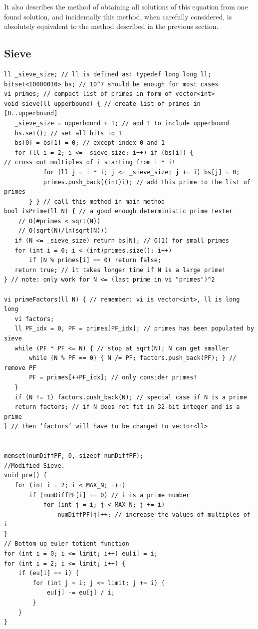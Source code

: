 \documentclass[8pt, a4paper, oneside, twocolumn]{extarticle}
\begin{document}
It also describes the method of obtaining all solutions of this equation from one found solution, and incidentally this method, when carefully considered, is absolutely equivalent to the method described in the previous section.
\subsection{Sieve}
\begin{verbatim}
ll _sieve_size; // ll is defined as: typedef long long ll;
bitset<10000010> bs; // 10^7 should be enough for most cases
vi primes; // compact list of primes in form of vector<int>
void sieve(ll upperbound) { // create list of primes in [0..upperbound]
   _sieve_size = upperbound + 1; // add 1 to include upperbound
   bs.set(); // set all bits to 1
   bs[0] = bs[1] = 0; // except index 0 and 1
   for (ll i = 2; i <= _sieve_size; i++) if (bs[i]) {
// cross out multiples of i starting from i * i!
           for (ll j = i * i; j <= _sieve_size; j += i) bs[j] = 0;
           primes.push_back((int)i); // add this prime to the list of primes
       } } // call this method in main method
bool isPrime(ll N) { // a good enough deterministic prime tester
    // O(#primes < sqrt(N))
    // O(sqrt(N)/ln(sqrt(N)))
   if (N <= _sieve_size) return bs[N]; // O(1) for small primes
   for (int i = 0; i < (int)primes.size(); i++)
       if (N % primes[i] == 0) return false;
   return true; // it takes longer time if N is a large prime!
} // note: only work for N <= (last prime in vi "primes")^2

vi primeFactors(ll N) { // remember: vi is vector<int>, ll is long long
   vi factors;
   ll PF_idx = 0, PF = primes[PF_idx]; // primes has been populated by sieve
   while (PF * PF <= N) { // stop at sqrt(N); N can get smaller
       while (N % PF == 0) { N /= PF; factors.push_back(PF); } // remove PF
       PF = primes[++PF_idx]; // only consider primes!
   }
   if (N != 1) factors.push_back(N); // special case if N is a prime
   return factors; // if N does not fit in 32-bit integer and is a prime
} // then ‘factors’ will have to be changed to vector<ll>


memset(numDiffPF, 0, sizeof numDiffPF);
//Modified Sieve.
void pre() {
   for (int i = 2; i < MAX_N; i++)
       if (numDiffPF[i] == 0) // i is a prime number
           for (int j = i; j < MAX_N; j += i)
               numDiffPF[j]++; // increase the values of multiples of i
}
// Bottom up euler totient function
for (int i = 0; i <= limit; i++) eu[i] = i;
for (int i = 2; i <= limit; i++) {
    if (eu[i] == i) {
        for (int j = i; j <= limit; j += i) {
            eu[j] -= eu[j] / i;
        }
    }
}
\end{verbatim}
\end{document}
